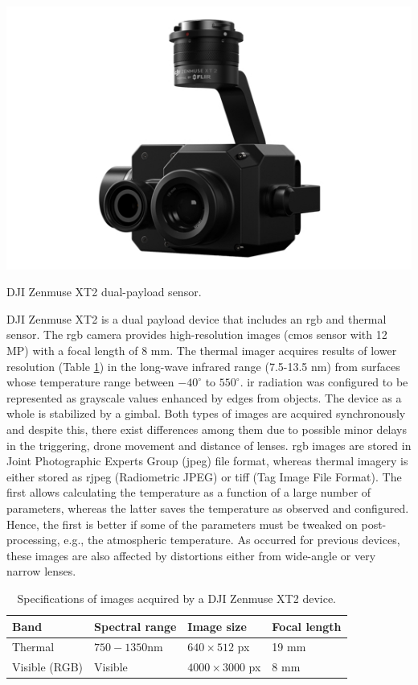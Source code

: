 \begin{marginfigure}[.1cm]
	\includegraphics{figs/materials/zenmuse_xt2.png}
	\caption{DJI Zenmuse XT2 dual-payload sensor.}
	\label{fig:zenmuse_xt2}
\end{marginfigure}
DJI Zenmuse XT2 is a dual payload device that includes an \acrshort{rgb} and thermal sensor. The \acrshort{rgb} camera provides high-resolution images (\acrshort{cmos} sensor with 12 MP) with a focal length of 8 \si{\milli\meter}. The thermal imager acquires results of lower resolution (Table \ref{table:zenmuse_xt2}) in the long-wave infrared range (7.5-13.5 \si{\nano\meter}) from surfaces whose temperature range between $-40^\circ$ to $550^\circ$. \acrshort{ir} radiation was configured to be represented as grayscale values enhanced by edges from objects. The device as a whole is stabilized by a gimbal. Both types of images are acquired synchronously and despite this, there exist differences among them due to possible minor delays in the triggering, drone movement and distance of lenses. \acrshort{rgb} images are stored in Joint Photographic Experts Group (\acrshort{jpeg}) file format, whereas thermal imagery is either stored as \acrshort{rjpeg} (Radiometric JPEG) or \acrshort{tiff} (Tag Image File Format). The first allows calculating the temperature as a function of a large number of parameters, whereas the latter saves the temperature as observed and configured. Hence, the first is better if some of the parameters must be tweaked on post-processing, e.g., the atmospheric temperature. As occurred for previous devices, these images are also affected by distortions either from wide-angle or very narrow lenses.

\renewcommand{\arraystretch}{1.2}
\begin{table}[ht]
    \caption{Specifications of images acquired by a DJI Zenmuse XT2 device.}
    \label{table:zenmuse_xt2}
    \begin{tabular}{llll}
        \toprule
        Band & Spectral range & Image size & Focal length\\
        \midrule
        Thermal & $750-1350 \si{\nano\meter}$ & $640 \times 512$ px & 19 \si{\milli\meter}\\
        Visible (RGB) & Visible & $4000 \times 3000$ px & 8 \si{\milli\meter}\\
        \bottomrule
    \end{tabular}
\end{table}
\renewcommand{\arraystretch}{1}


